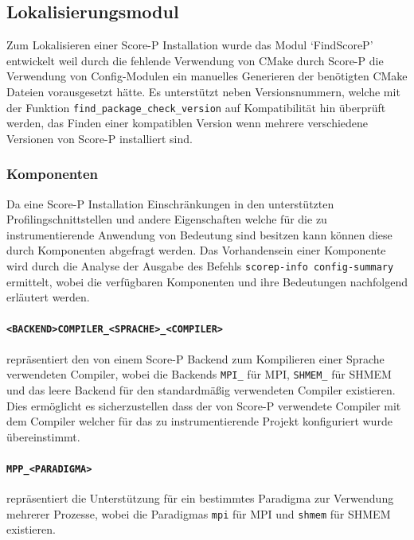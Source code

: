 \documentclass[german,proseminar,hyperref,utf8,lof]{zihpub}
\begin{document}
    \subsection{Lokalisierungsmodul}
    Zum Lokalisieren einer Score-P Installation wurde das Modul `FindScoreP' entwickelt weil
    durch die fehlende Verwendung von CMake durch Score-P die Verwendung von Config-Modulen
    ein manuelles Generieren der benötigten CMake Dateien vorausgesetzt hätte.
    Es unterstützt neben Versionsnummern, welche mit der Funktion \texttt{find\_package\_check\_version}
    auf Kompatibilität hin überprüft werden, das Finden einer kompatiblen Version wenn
    mehrere verschiedene Versionen von Score-P installiert sind.

    \subsubsection{Komponenten}
    Da eine Score-P Installation Einschränkungen in den unterstützten Profilingschnittstellen und
    andere Eigenschaften welche für die zu instrumentierende Anwendung von Bedeutung sind besitzen
    kann können diese durch Komponenten abgefragt werden.
    Das Vorhandensein einer Komponente wird durch die Analyse der Ausgabe des Befehls
    \texttt{scorep-info config-summary} ermittelt, wobei die verfügbaren Komponenten und ihre
    Bedeutungen nachfolgend erläutert werden.

    \paragraph{\texttt{<BACKEND>COMPILER\_<SPRACHE>\_<COMPILER>}} repräsentiert den von einem Score-P Backend
    zum Kompilieren einer Sprache verwendeten Compiler, wobei die Backends \texttt{MPI\_} für MPI,
    \texttt{SHMEM\_} für SHMEM und das leere Backend für den standardmä{\ss}ig verwendeten Compiler existieren.
    Dies ermöglicht es sicherzustellen dass der von Score-P verwendete Compiler mit dem Compiler
    welcher für das zu instrumentierende Projekt konfiguriert wurde übereinstimmt.

    \paragraph{\texttt{MPP\_<PARADIGMA>}} repräsentiert die Unterstützung für ein bestimmtes Paradigma zur
    Verwendung mehrerer Prozesse, wobei die Paradigmas \texttt{mpi} für MPI und \texttt{shmem} für SHMEM existieren.
\end{document}
